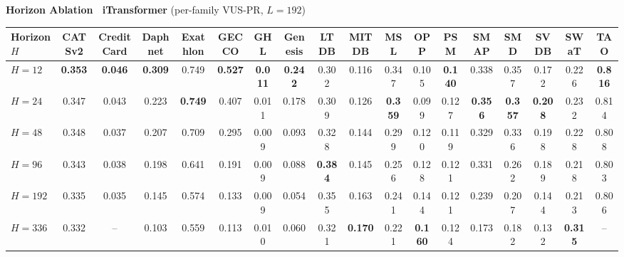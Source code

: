 \documentclass[border=2pt,varwidth=\maxdimen]{standalone}
\begin{document}
\begin{center}
\textbf{\large Horizon Ablation \textemdash\ iTransformer} \quad (per-family VUS-PR, $L=192$)\par\vspace{6pt}
\renewcommand{\arraystretch}{1.1}
\setlength{\tabcolsep}{3pt}
\footnotesize

\begin{tabular}{l|ccccccccccccccccc}
\toprule
\textbf{Horizon $H$} & \textbf{CATSv2} & \textbf{CreditCard} & \textbf{Daphnet} & \textbf{Exathlon} & \textbf{GECCO} & \textbf{GHL} & \textbf{Genesis} & \textbf{LTDB} & \textbf{MITDB} & \textbf{MSL} & \textbf{OPP} & \textbf{PSM} & \textbf{SMAP} & \textbf{SMD} & \textbf{SVDB} & \textbf{SWaT} & \textbf{TAO} \\
\midrule
\textbf{$H=12$} & \textbf{0.353} & \textbf{0.046} & \textbf{0.309} & 0.749 & \textbf{0.527} & \textbf{0.011} & \textbf{0.242} & 0.302 & 0.116 & 0.347 & 0.105 & \textbf{0.140} & 0.338 & 0.357 & 0.172 & 0.226 & \textbf{0.816} \\
\textbf{$H=24$} & 0.347 & 0.043 & 0.223 & \textbf{0.749} & 0.407 & 0.011 & 0.178 & 0.309 & 0.126 & \textbf{0.359} & 0.099 & 0.127 & \textbf{0.356} & \textbf{0.357} & \textbf{0.208} & 0.232 & 0.814 \\
\textbf{$H=48$} & 0.348 & 0.037 & 0.207 & 0.709 & 0.295 & 0.009 & 0.093 & 0.328 & 0.144 & 0.299 & 0.120 & 0.119 & 0.329 & 0.336 & 0.198 & 0.228 & 0.808 \\
\textbf{$H=96$} & 0.343 & 0.038 & 0.198 & 0.641 & 0.191 & 0.009 & 0.088 & \textbf{0.384} & 0.145 & 0.256 & 0.128 & 0.121 & 0.331 & 0.262 & 0.189 & 0.218 & 0.803 \\
\textbf{$H=192$} & 0.335 & 0.035 & 0.145 & 0.574 & 0.133 & 0.009 & 0.054 & 0.355 & 0.163 & 0.241 & 0.144 & 0.121 & 0.239 & 0.207 & 0.144 & 0.213 & 0.806 \\
\textbf{$H=336$} & 0.332 & -- & 0.103 & 0.559 & 0.113 & 0.010 & 0.060 & 0.321 & \textbf{0.170} & 0.221 & \textbf{0.160} & 0.124 & 0.173 & 0.182 & 0.132 & \textbf{0.315} & -- \\
\bottomrule
\end{tabular}
\end{center}
\end{document}
